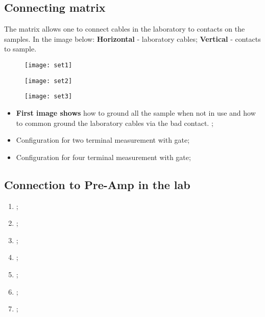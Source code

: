   \subsection{Connecting matrix}
  The  matrix allows  one  to  connect cables  in  the laboratory  to
  contacts on the samples. In  the image below: \textbf{Horizontal} -
  laboratory cables; \textbf{Vertical} - contacts to sample.


\begin{figure}[h]
  \centering
  \begin{minipage}{0.4\linewidth}
    \texttt{[image: set1]}
  \end{minipage}
  \begin{minipage}{0.4\linewidth}
    \texttt{[image: set2]}
  \end{minipage}
  \begin{minipage}{0.4\linewidth}
    \texttt{[image: set3]}
  \end{minipage}
\end{figure}
\begin{itemize}
\item \textbf{First  image shows} how  to ground all the  sample when
  not in use  and how to common ground the  laboratory cables via the
  bad contact.   ;
\item Configuration for two terminal measurement with gate;
\item Configuration for four terminal measurement with gate;
\end{itemize}

\subsection{Connection to Pre-Amp in the lab}
\begin{enumerate}
\item {};
\item  {};
\item {};
\item {};
\item {};
\item {};
\item {};
\end{enumerate}


\newpage
